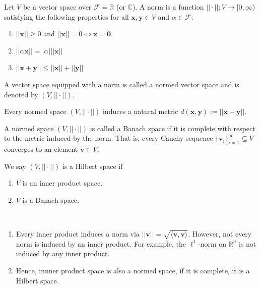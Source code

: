 \begin{definition}
Let $V$ be a vector space over $\mathcal{F} = \mathbb{R}$ (or $\mathbb{C}$). A norm is a function $||\cdot||: V \rightarrow [0, \infty)$ satisfying the following properties for all $\mathbf{x}, \mathbf{y} \in V$ and $\alpha \in \mathcal{F}$:
\begin{enumerate}
    \item $||\mathbf{x}|| \ge 0 $ and $||\mathbf{x}|| = 0 \iff \mathbf{x} = \mathbf{0}.$
    \item $||\alpha \mathbf{x}|| = |\alpha| ||\mathbf{x}||$
    \item $||\mathbf{x}+\mathbf{y}|| \le ||\mathbf{x}|| + ||\mathbf{y}||$
\end{enumerate}
A vector space equipped with a norm is called a normed vector space and is denoted by $(V, ||\cdot||)$.
\end{definition}

\begin{remark}
Every normed space $(V, ||\cdot||)$ induces a natural metric $d(\mathbf{x},\mathbf{y}) := ||\mathbf{x}-\mathbf{y}||$.
\end{remark}

\begin{definition}
A normed space $(V, ||\cdot||)$ is called a Banach space if it is complete with respect to the metric induced by the norm. That is, every Cauchy sequence $\{\mathbf{v}_i\}_{i=1}^\infty \subseteq V$ converges to an element $\mathbf{v}\in V$.
\end{definition}


\begin{definition}
    We say $(V, ||\cdot||)$ is a Hilbert space if
    \begin{enumerate}
        \item $V$ is an inner product space.
        \item $V$ is a Banach space.
    \end{enumerate}
\end{definition}

\begin{remark}\ \vspace{-1em}
    \begin{enumerate}
        \item Every inner product induces a norm via $||\mathbf{v}|| = \sqrt{\langle \mathbf{v}, \mathbf{v} \rangle}$. However, not every norm is induced by an inner product. For example, the $\ell^1$-norm on $\mathbb{R}^n$ is not induced by any inner product.
        \item Hence, innner product space is also a normed space, if it is complete, it is a Hilbert space.
    \end{enumerate}
\end{remark}


